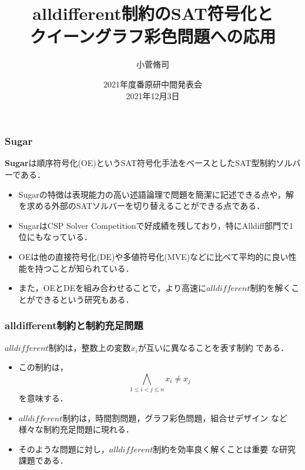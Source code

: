 \documentclass [dvipdfmx,11pt]{beamer}
\title{alldifferent制約のSAT符号化と\\クイーングラフ彩色問題への応用}
\author{小菅脩司}
\date{2021年度番原研中間発表会\\2021年12月3日}
\institute{番原研究室}
\newcommand{\alldifferent}{$alldifferent$}
\begin{document}
\begin{frame} {}
    \titlepage
\end{frame}



\begin{frame}
    \frametitle{Sugar}
    \begin{alertblock}{}
        \alert{\bf Sugar}は順序符号化(OE)というSAT符号化手法をベースとしたSAT型制約ソルバーである．
    \end{alertblock}
    \begin{itemize}
        \item Sugarの特徴は表現能力の高い述語論理で問題を簡潔に記述できる点や，解を求める外部のSATソルバーを切り替えることができる点である．
        \item SugarはCSP Solver Competitionで好成績を残しており，特にAlldiff部門で1位にもなっている．
        \item OEは他の直接符号化(DE)や多値符号化(MVE)などに比べて平均的に良い性能を持つことが知られている．
        \item また，OEとDEを組み合わせることで，より高速に{\alldifferent}制約を解くことができるという研究もある．
    \end{itemize}
\end{frame}



\begin{frame}
    \frametitle{alldifferent制約と制約充足問題}
    \begin{alertblock}{}
        {\alldifferent}制約は，整数上の変数$x_{i}$が互いに異なることを表す制約
        である．
    \end{alertblock}
    \begin{itemize}
        \item この制約は，
            $$\bigwedge_{1 \leq i < j \leq n} x_i \neq x_j$$
            を意味する．
        \item {\alldifferent}制約は，時間割問題，グラフ彩色問題，組合せデザイン
            など様々な制約充足問題に現れる．
        \item そのような問題に対し，{\alldifferent}制約を効率良く解くことは重要
            な研究課題である．
    \end{itemize}
\end{frame}
\end{document}
